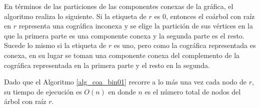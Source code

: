 En términos de las particiones de las componentes conexas de la gráfica, el algoritmo realiza lo siguiente. Si la etiqueta de $r$ es $0$, entonces el coárbol con raíz en $r$ representa una cográfica inconexa y se elige la partición de sus vértices en la que la primera parte es una componente conexa y la segunda parte es el resto. Sucede lo mismo si la etiqueta de $r$ es uno, pero como la cográfica representada es conexa, en su lugar se toman una componente conexa del complemento de la cográfica representada en la primera parte y el resto en la segunda. 

Dado que el Algoritmo \ref{alg_coa_bin01} recorre a lo más una vez cada nodo de $r$, su tiempo de ejecución es $O(n)$ en donde $n$ es el número total de nodos del árbol con raíz $r$.